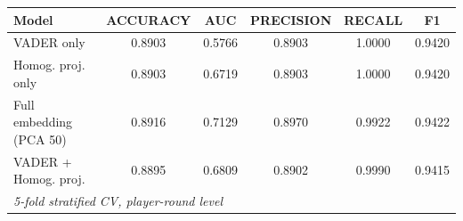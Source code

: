 \begingroup
\centering
\begin{tabular}{lccccc}
   \tabularnewline \midrule \midrule
   Model & ACCURACY & AUC & PRECISION & RECALL & F1 \\
   \midrule
   VADER only & 0.8903 & 0.5766 & 0.8903 & 1.0000 & 0.9420 \\
   Homog. proj. only & 0.8903 & 0.6719 & 0.8903 & 1.0000 & 0.9420 \\
   Full embedding (PCA 50) & 0.8916 & 0.7129 & 0.8970 & 0.9922 & 0.9422 \\
   VADER + Homog. proj. & 0.8895 & 0.6809 & 0.8902 & 0.9990 & 0.9415 \\
   \midrule \midrule
   \multicolumn{6}{l}{\emph{5-fold stratified CV, player-round level}}\\
\end{tabular}
\par\endgroup
